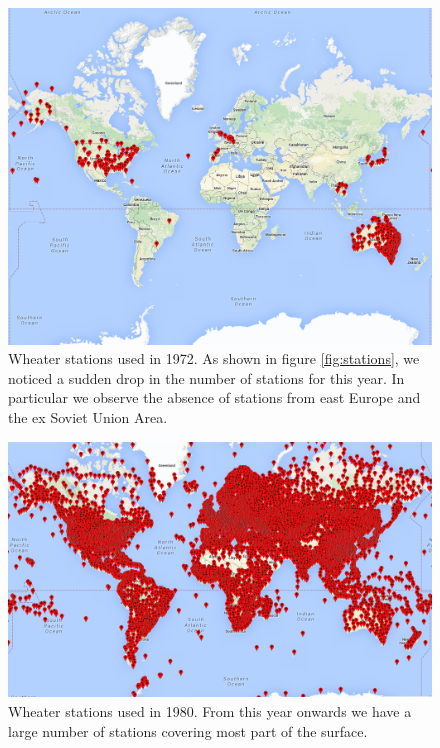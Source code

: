 \documentclass{vldb}
\begin{document}
\begin{figure}[tbh]
\includegraphics[width=1\linewidth]{stations1972}
\caption{Wheater stations used in 1972. As shown in figure \ref{fig:stations}, we noticed a sudden drop in the number of stations for this year. In particular we observe the absence of stations from east Europe and the ex Soviet Union Area.}
\label{fig:stations1972}
\end{figure}

\begin{figure}[tbh]
\includegraphics[width=1\linewidth]{stations1980}
\caption{Wheater stations used in 1980. From this year onwards we have a large number of stations covering most part of the surface.}
\label{fig:stations1980}
\end{figure}
\end{document}
